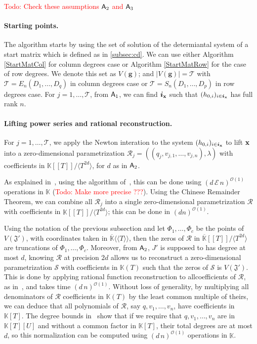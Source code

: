 \documentclass[11pt]{article}
\numberwithin{Property}{section}
\numberwithin{Theorem}{section}
\numberwithin{Proposition}{section}
\numberwithin{Lemma}{section}
\numberwithin{Corollary}{section}
\numberwithin{Definition}{section}
\numberwithin{Remark}{section}
\numberwithin{Conjecture}{section}
\numberwithin{Problem}{section}
\numberwithin{Claim}{section}
\theoremstyle{definition}
\numberwithin{Example}{section}
\def\g {\ensuremath{\mathbf{g}}}
\def\bar{\overline}
\newcommand{\bigO}[1]{\mathcal{O}(#1)} %
\newcommand{\field}{\mathbb{K}} %
\newcommand{\todo}[1]{\textcolor{red}{#1}} %
\newcommand{\improve}[1]{\textcolor{blue}{#1}} %
\begin{document}
\todo{Todo: Check these assumptions ${\sf A}_2$ and ${\sf A}_3$}
\paragraph{Starting points.} The algorithm starts by using the set of solution of the determiantal system of a start matrix which is defined as in \improve{\cref{subsec:cd}}. We can use either Algorithm \ref{StartMatCol} for column degrees case or Algorithm \ref{StartMatRow} for the case of row degrees. We denote this set as $V(\g)$; and $|V(\g)| = \mathcal{T}$ with $\mathcal{T} = E_{n}(D_1, \ldots, D_q)$ in column degrees case  or $\mathcal{T} = S_{n}(D_1, \ldots, D_p)$ in row degrees case. For $j  =1, \ldots, \mathcal{T}$, from ${\sf A}_1 $, we can find ${\bm i}_{\bf x}$ such that $(h_{0,i})_{i \in {\bm i}_{\bf x}}$ has full rank $n$. 

\paragraph{Lifting power series and rational reconstruction.} For $j  =1, \ldots, \mathcal{T}$, we apply the Newton interation to the system $(h_{0,i})_{i \in {\bm i}_{\bf x}}$ to lift ${\bf x}$ into a zero-dimensional parametrization $\mathscr{R}_j = ((q_j,v_{j,1}, \ldots, v_{j,n}), \lambda)$ with coefficients in $\field[[T]]/\langle T^{2d}\rangle$, for $d$ as in ${\sf A}_2$. 

As explained in~\cite[Section~2.2]{SaSc16}, using the algorithm of~\cite{GiLeSa01}, this can be done using $(d\,\mathcal{E}\,n)^{\bigO{1}}$ operations in $\field$ (\todo{Todo: Make more precise ???}). Using the Chinese Remainder Theorem, we can combine all $\mathscr{R}_j$ into a single zero-dimensional parametrization $\mathscr{R}$ with coefficients in $\field[[T]]/\langle T^{2d}\rangle$; this can be done in $(dn)^{\bigO{1}}$. 

Using the notation of the previous subsection and let $\Phi_1,\dots,\Phi_{c}$ be the points of $V(\mathfrak{J}')$, with coordinates taken in $\bar{\field}\langle\langle T \rangle\rangle$, then the zeros of $\mathscr{R}$ in $\bar{\field}[[T]]/\langle T^{2d} \rangle$ are truncations of $\Phi_1,\dots,\Phi_{c}$. Moreover, from ${\sf A}_2$, $J'$ is supposed to has degree at most $d$, knowing $\mathscr{R}$  at precision $2d$ allows us to reconstruct a zero-dimensional parametrization $\mathscr{S}$ with coefficients in $\field(T)$ such that the zeros of $\mathscr{S}$ is $V(\mathfrak{J}')$. This is done by applying rational function reconstruction to allcoefficients of $\mathscr{R}$, as in~\cite{Schost03}, and takes time $(d\,n)^{\bigO{1}}$. Without loss of generality, by multiplying all denominators of $\mathscr{R}$ coefficients in $\field(T)$ by the least common multiple of theirs, we can deduce that all polynomials of $\mathscr{R}$, say $q, v_1, \ldots, v_n$, have coefficients in $\field[T]$. The degree bounds in~\cite{Schost03} show that
if we require that $q, v_1, \ldots, v_n$ are in $\field[T][U]$ and without a common factor in $\field[T]$,
their total degrees are at most $d$, so this normalization can be
computed using $(d\,n)^{\bigO{1}}$ operations in $\field$. 
\end{document}
